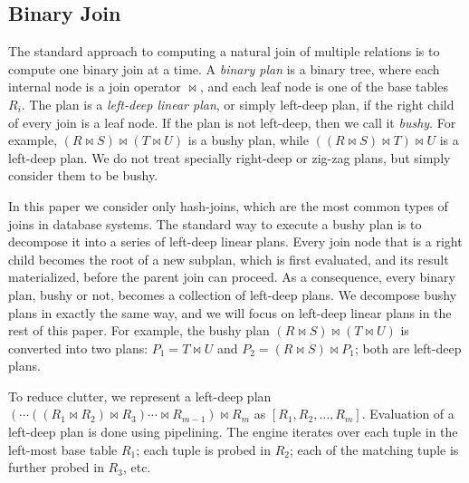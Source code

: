 \subsection{Binary Join}\label{sec:binary-join}

The standard approach to computing a natural join of multiple relations is
to compute one binary join at a time.  A {\em binary plan} is a binary
tree, where each internal node is a join operator $\Join$, and each
leaf node is one of the base tables $R_i$.
The plan is a \emph{left-deep linear plan}, or
simply left-deep plan, if the right child of every join is a leaf
node.  If the plan is not left-deep, then we call it \emph{bushy}.
For example, $(R \Join S) \Join (T \Join U)$ is a bushy plan, while
$((R \Join S) \Join T) \Join U$ is a left-deep plan.  We do not treat
specially right-deep or zig-zag plans, but simply consider them to be
bushy.

In this paper we consider only hash-joins, which are the most
common types of joins in database systems.
The standard way to execute a bushy plan is to
decompose it into a series of left-deep linear plans.  Every join node
that is a right child becomes the root of a new subplan, which is
first evaluated, and its result materialized, before the parent join
can proceed.  As a consequence, every binary plan, bushy or not,
becomes a collection of left-deep plans. We decompose bushy
plans in exactly the same way, and we will focus on left-deep linear
plans in the rest of this paper.  For example, the bushy plan
$(R \Join S) \Join (T \Join U)$ is converted into two plans:
$P_1 = T \Join U$ and $P_2 = (R \Join S) \Join P_1$; both are
left-deep plans.

To reduce clutter, we represent a left-deep plan
$(\cdots ((R_1 \Join R_2) \Join R_3) \cdots \Join R_{m-1}) \Join R_m$
as $[R_1, R_2, \ldots, R_m]$.  Evaluation of a left-deep plan is done
using pipelining.  The engine iterates over each tuple in the
left-most base table $R_1$; each tuple is probed in $R_2$; each of the
matching tuple is further probed in $R_3$, etc.


